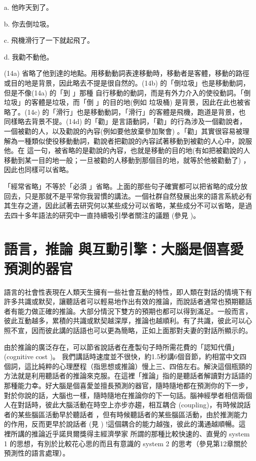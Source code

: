 a. 他昨天到了。

b. 你去倒垃圾。

c. 飛機滑行了一下就起飛了。

d. 我勸不動他。

(14a) 省略了他到達的地點。用移動動詞表達移動時，移動者是客體，移動的路徑或目的地是背景，因此略去不提是很自然的。(14b) 的「倒垃圾」也是移動動詞，但是不像(14a) 的「到 」那種 自行移動的動詞，而是有外力介入的使役動詞。「倒垃圾」的客體是垃圾，而「倒 」的目的地(例如 垃圾桶) 是背景，因此在此也被省略了。(14c) 的「滑行」也是移動動詞，「滑行」的客體是飛機，跑道是背景，也同樣略去背景不提。(14d) 的「勸」是言語動詞，「勸」的行為涉及一個勸說者，一個被勸的人，以及勸說的內容(例如要他放棄參加聚會) 。「勸」其實很容易被理解為一種類似使役移動動詞，勸說者把勸說的內容試著移動到被勸的人心中，說服他。在 這一句，被省略的是勸說的內容，也就是移動的目的地(有如把被勸說的人移動到某一目的地一般；一旦被勸的人移動到那個目的地，就等於他被勸動了) ，因此也同樣可以省略。

「經常省略」不等於「必須 」省略。上面的那些句子確實都可以把省略的成分放回去，只是那就不是平常你我習慣的講法。一個社群自然發展出來的語言系統必有其生存之道，因此試著去研究何以某些成分可以省略，某些成分不可以省略，是過去四十多年語法的研究中一直持續吸引學者關注的議題 (參見 \citealt{David2016})。                 

\section{語言，推論 與互動引擎：大腦是個喜愛預測的器官} %

語言的社會性表現在人類天生擁有一些社會互動的特性，即人類在對話的情境下有許多共識或默契，讓聽話者可以輕易地作出有效的推論，而說話者通常也預期聽話者有能力做正確的推論。大部分情況下雙方的預期也都可以得到滿足。一般而言，彼此互動越多，累積的共識或默契越深厚，推論也越順利。有了共識，彼此可以心照不宣，因而彼此講的話語也可以更為簡略，正如上面那對夫妻的對話所顯示的。

由於推論的廣泛存在，可以節省說話者在產製句子時所需花費的「認知代價」 (cognitive cost )。 我們講話時速度並不很快，約1.5秒講6個音節，約相當中文四個詞，這比純粹的心理歷程（指思想或推論）慢上三、四倍左右。解決這個瓶頸的方法就是利用聽話者的推論來克服。在這裡「推論」指的是聽話者解讀對方話語的那種能力幸。好大腦是個喜愛並擅長預測的器官，隨時隨地都在預測你的下一步，對於你說的話，大腦也一樣，隨時隨地在推論你的下一句話。腦神經學者相信兩個人在對話時，彼此大腦活動在時空上亦步亦趨，相互耦合 (coupling)，有時候說話者的某些腦區活動早於聽話者 ，但有時候聽話者的某些腦區活動，由於推測能力的作用，反而更早於說話者 (見 \citealt{StephensEtAl2010}) !這個耦合的能力越強，彼此的溝通越順暢。這裡所講的推論近乎諾貝爾獎得主經濟學家\citet{Kahneman2011} 所謂的那種比較快速的、直覺的 system 1 的思想，有別於比較花心思的而且有意識的 system 2 的思考（參見第12章關於預測性的語言處理）。

